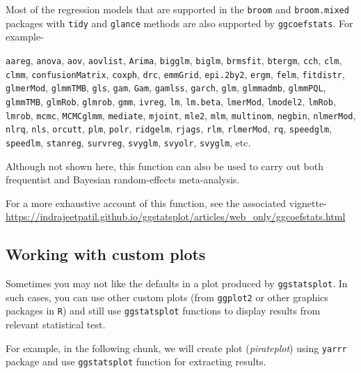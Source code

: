 \documentclass[]{article}
\begin{document}
Most of the regression models that are supported in the \texttt{broom} and
\texttt{broom.mixed} packages with \texttt{tidy} and \texttt{glance} methods are also supported by
\texttt{ggcoefstats}. For example-

\texttt{aareg}, \texttt{anova}, \texttt{aov}, \texttt{aovlist}, \texttt{Arima}, \texttt{bigglm}, \texttt{biglm}, \texttt{brmsfit},
\texttt{btergm}, \texttt{cch}, \texttt{clm}, \texttt{clmm}, \texttt{confusionMatrix}, \texttt{coxph}, \texttt{drc}, \texttt{emmGrid},
\texttt{epi.2by2}, \texttt{ergm}, \texttt{felm}, \texttt{fitdistr}, \texttt{glmerMod}, \texttt{glmmTMB}, \texttt{gls}, \texttt{gam},
\texttt{Gam}, \texttt{gamlss}, \texttt{garch}, \texttt{glm}, \texttt{glmmadmb}, \texttt{glmmPQL}, \texttt{glmmTMB}, \texttt{glmRob},
\texttt{glmrob}, \texttt{gmm}, \texttt{ivreg}, \texttt{lm}, \texttt{lm.beta}, \texttt{lmerMod}, \texttt{lmodel2}, \texttt{lmRob},
\texttt{lmrob}, \texttt{mcmc}, \texttt{MCMCglmm}, \texttt{mediate}, \texttt{mjoint}, \texttt{mle2}, \texttt{mlm}, \texttt{multinom},
\texttt{negbin}, \texttt{nlmerMod}, \texttt{nlrq}, \texttt{nls}, \texttt{orcutt}, \texttt{plm}, \texttt{polr}, \texttt{ridgelm},
\texttt{rjags}, \texttt{rlm}, \texttt{rlmerMod}, \texttt{rq}, \texttt{speedglm}, \texttt{speedlm}, \texttt{stanreg}, \texttt{survreg},
\texttt{svyglm}, \texttt{svyolr}, \texttt{svyglm}, etc.

Although not shown here, this function can also be used to carry out both
frequentist and Bayesian random-effects meta-analysis.

For a more exhaustive account of this function, see the associated vignette-
\url{https://indrajeetpatil.github.io/ggstatsplot/articles/web_only/ggcoefstats.html}

\hypertarget{working-with-custom-plots}{%
\subsection{Working with custom plots}\label{working-with-custom-plots}}

Sometimes you may not like the defaults in a plot produced by \texttt{ggstatsplot}. In
such cases, you can use other custom plots (from \texttt{ggplot2} or other graphics
packages in \texttt{R}) and still use \texttt{ggstatsplot} functions to display results from relevant
statistical test.

For example, in the following chunk, we will create plot (\emph{pirateplot}) using
\texttt{yarrr} package and use \texttt{ggstatsplot} function for extracting results.
\end{document}
